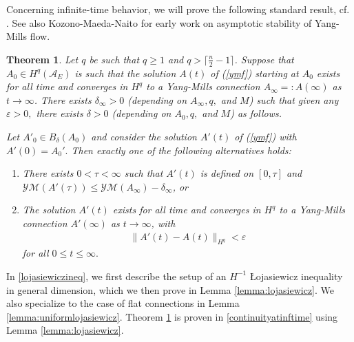 \documentclass[12pt]{amsart}
\newcommand{\LB}{\left[}
\newcommand{\RB}{\right]}
\renewcommand{\1}{{\mathbf 1}}
\newcommand{\calA}{\mathcal{A}}
\newcommand{\eps}{{\varepsilon}}
\newtheorem{thm}{Theorem}[section]
\theoremstyle{others}
\numberwithin{equation}{section}
\begin{document}
Concerning infinite-time behavior, we will prove the following standard result, cf. \cite[Prop. 7.4]{rade}. See also Kozono-Maeda-Naito \cite{kozonomaedaasymptoticstability, kozonomaedanaitostablemanifold} for early work on asymptotic stability of Yang-Mills flow.
\begin{thm}\label{thm:continuityatinfinitetime}
    Let \(q\) be such that \(q \geq 1\) and \(q > \lceil\frac{n}{2}-1\rceil\). %
    Suppose that \(A_0 \in H^q(\mathcal{A}_E)\) is such that the solution $A(t)$ of (\ref{ymf}) starting at \(A_0\) exists for all time and converges in \(H^q\) to a Yang-Mills connection \(A_\infty =: A(\infty)\) as \(t \to \infty\). There exists \(\delta_\infty > 0 \) (depending on \(A_\infty, q,\) and \(M\)) such that given any $\eps > 0,$ there exists \(\delta > 0\) (depending on \(A_0, q,\) and \(M\)) as follows.
    
    Let \(A'_0 \in B_{\delta}(A_0)\) and consider the solution $A'(t)$ of (\ref{ymf}) with $A'(0) = A_0'.$ Then exactly one of the following alternatives holds:
    \begin{enumerate}
        \item There exists \(0 < \tau < \infty\) such that $A'(t)$ is defined on $\LB 0 , \tau \RB$ and \(\mathcal{YM}(A'(\tau)) \leq \mathcal{YM}(A_\infty) - \delta_\infty\), or
        \item The solution \(A'(t)\) exists for all time and converges in \(H^q\) to a Yang-Mills connection $A'(\infty)$ as \(t \to \infty\), with \begin{align}\label{continuityatinfinitetime:continuityestimate}
            \| A'(t) - A(t) \|_{H^q} < \eps
        \end{align}
        for all $0 \leq t \leq \infty.$ %
    \end{enumerate}
\end{thm}

In \textsection \ref{lojasiewiczineq}, we first describe the setup of an $H^{-1}$ \L ojasiewicz inequality in general dimension, which we then prove in Lemma \ref{lemma:lojasiewicz}. We also specialize to the case of flat connections in Lemma \ref{lemma:uniformlojasiewicz}. Theorem \ref{thm:continuityatinfinitetime} is proven in \textsection \ref{continuityatinftime} using Lemma \ref{lemma:lojasiewicz}.
\end{document}
